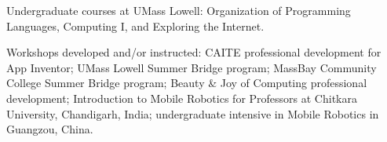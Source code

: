 \noindent Undergraduate courses at UMass Lowell: Organization of Programming Languages, Computing I, and Exploring the Internet.

\noindent Workshops developed and/or instructed: CAITE professional development for App Inventor; UMass Lowell Summer Bridge program; MassBay Community College Summer Bridge program; Beauty \& Joy of Computing professional development; Introduction to Mobile Robotics for Professors at Chitkara University, Chandigarh, India; undergraduate intensive in Mobile Robotics in Guangzou, China. 
